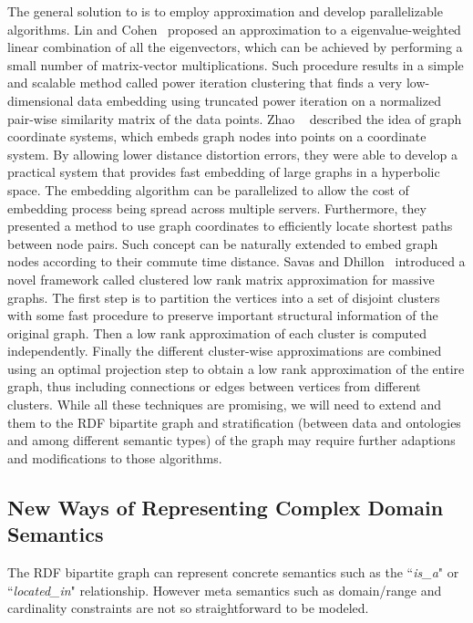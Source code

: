 The general solution to is to employ approximation and develop parallelizable algorithms. Lin and Cohen~\cite{LinEtal2010ICML} proposed an approximation to a eigenvalue-weighted linear combination of all the eigenvectors, which can be achieved by performing a small number of matrix-vector multiplications.  Such procedure results in a simple and scalable method called power iteration clustering that finds a very low-dimensional data embedding using truncated power iteration on a normalized pair-wise similarity matrix of the data points. Zhao \etal~\cite{ZhaoEtal2011Eff} described the idea of graph coordinate systems, which embeds graph nodes into points on a coordinate system. By allowing lower distance distortion errors, they were able to develop a practical system that provides fast embedding of large graphs in a hyperbolic space. The embedding algorithm can be parallelized to allow the cost of embedding process being spread across multiple servers. Furthermore, they presented a method to use graph coordinates to efficiently locate shortest paths between node pairs. Such concept can be naturally extended to embed graph nodes according to their commute time distance. Savas and Dhillon~\cite{SavasEtal2011Clu} introduced a novel framework called clustered low rank matrix approximation for massive graphs. The first step is to partition the vertices into a set of disjoint clusters with some fast procedure to preserve important structural information of the original graph. Then a low rank approximation of each cluster is computed independently. Finally the different cluster-wise approximations are combined using an optimal projection step to obtain a low rank approximation of the entire graph, thus including connections or edges between vertices from different clusters. While all these techniques are promising, we will need to extend and them to the RDF bipartite graph and stratification (between data and ontologies and among different semantic types) of the graph may require further adaptions and modifications to those algorithms.

\subsection{New Ways of Representing Complex Domain Semantics}
The RDF bipartite graph can represent concrete semantics such as the ``\emph{is\_a}" or ``\emph{located\_in}" relationship. However meta semantics such as domain/range and cardinality constraints are not so straightforward to be modeled.

